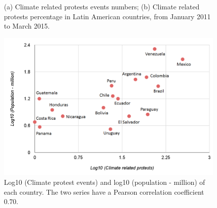 \begin{figure}[t]
	\centering
	\caption{(a) Climate related protests events numbers; (b) Climate related protests percentage in Latin American countries, from January 2011 to March 2015. }
\label{map}
\end{figure}



\begin{figure}[ht]
\centerline
{\includegraphics[width=.8\textwidth]{figures/protest-population}}
\caption{Log10 (Climate protest events) and log10 (population - million) of each country. The two series have a Pearson correlation coefficient 0.70.}
\label{protest-population}
\end{figure}

